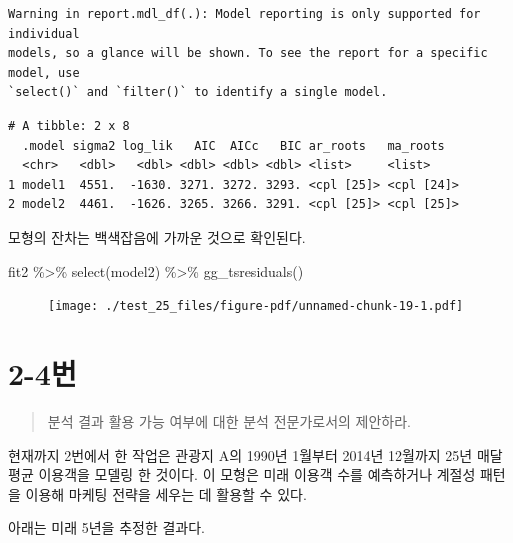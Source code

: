 \documentclass[
  letterpaper,
  DIV=11,
  numbers=noendperiod]{scrreprt}
\newenvironment{Shaded}{\begin{snugshade}}{\end{snugshade}}
\newcommand{\FunctionTok}[1]{\textcolor[rgb]{0.28,0.35,0.67}{#1}}
\newcommand{\NormalTok}[1]{\textcolor[rgb]{0.00,0.23,0.31}{#1}}
\newcommand{\SpecialCharTok}[1]{\textcolor[rgb]{0.37,0.37,0.37}{#1}}
\begin{document}
\begin{verbatim}
Warning in report.mdl_df(.): Model reporting is only supported for individual
models, so a glance will be shown. To see the report for a specific model, use
`select()` and `filter()` to identify a single model.
\end{verbatim}

\begin{verbatim}
# A tibble: 2 x 8
  .model sigma2 log_lik   AIC  AICc   BIC ar_roots   ma_roots  
  <chr>   <dbl>   <dbl> <dbl> <dbl> <dbl> <list>     <list>    
1 model1  4551.  -1630. 3271. 3272. 3293. <cpl [25]> <cpl [24]>
2 model2  4461.  -1626. 3265. 3266. 3291. <cpl [25]> <cpl [25]>
\end{verbatim}

모형의 잔차는 백색잡음에 가까운 것으로 확인된다.

\begin{Shaded}
\begin{Highlighting}[]
\NormalTok{fit2 }\SpecialCharTok{\%\textgreater{}\%} 
  \FunctionTok{select}\NormalTok{(model2) }\SpecialCharTok{\%\textgreater{}\%} 
  \FunctionTok{gg\_tsresiduals}\NormalTok{()}
\end{Highlighting}
\end{Shaded}

\begin{figure}[H]

{\centering \texttt{[image: ./test\_25\_files/figure-pdf/unnamed-chunk-19-1.pdf]}

}

\end{figure}

\hypertarget{uxbc88-47}{%
\section*{2-4번}\label{uxbc88-47}}


\begin{quote}
분석 결과 활용 가능 여부에 대한 분석 전문가로서의 제안하라.
\end{quote}

현재까지 2번에서 한 작업은 관광지 A의 1990년 1월부터 2014년 12월까지
25년 매달 평균 이용객을 모델링 한 것이다. 이 모형은 미래 이용객 수를
예측하거나 계절성 패턴을 이용해 마케팅 전략을 세우는 데 활용할 수 있다.

아래는 미래 5년을 추정한 결과다.
\end{document}
